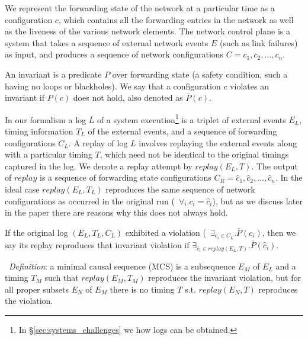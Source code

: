 We represent the forwarding state of the network
at a particular time as a configuration $c$, which contains all the forwarding
entries in the network
as well as the liveness of the various network elements.
The network control plane is a system that takes a sequence of
external network events $E$ (such as link failures) as input,
and produces a sequence of network configurations
$C = c_1,c_2,\dots,c_n$.

An invariant is a predicate $P$ over forwarding state (a safety
condition, such a having no loops or blackholes). We say that a configuration
$c$ violates an invariant if $P(c)$ does not
hold, also denoted as $\overline{P}(c)$.

In our formalism a log $L$ of a system execution\footnote{In
\S\ref{sec:systems_challenges} we how logs can be obtained.} is a triplet of external events $E_L$,
timing information $T_L$ of the external events, and a sequence of forwarding
configurations $C_L$.
A replay of log $L$ involves replaying the external events along with a
particular timing $T$,
which need not be identical to the original timings captured in the log.
We denote a replay attempt by $replay(E_L,T)$.
The output of $replay$ is a sequence of forwarding state configurations
$C_R = \hat{c}_1,\hat{c}_2,\dots,\hat{c}_n$. In the ideal case $replay(E_L,T_L)$ reproduces the same
sequence of network configurations as occurred in the original run
(\ie~$\forall_i. c_i = \hat{c}_i$), but as we discuss later in the paper there are reasons why
this does not always hold.

If the original log $(E_L, T_L, C_L)$ exhibited a violation
(\ie~$\exists_{c_i \in C_L}. \overline{P}(c_i)$,
then we say its replay reproduces that invariant violation if
$\exists_{\hat{c}_i \in replay(E_L,T)}. \overline{P}(\hat{c}_i)$.

\noindent~{\em Definition}: a minimal causal sequence (MCS) is a subsequence $E_M$
of $E_L$ and a timing $T_M$ such
that $replay(E_M,T_M)$ reproduces the invariant violation, but for all proper
subsets $E_N$ of $E_M$
there is no timing $T$ s.t. $replay(E_N,T)$ reproduces the violation.
